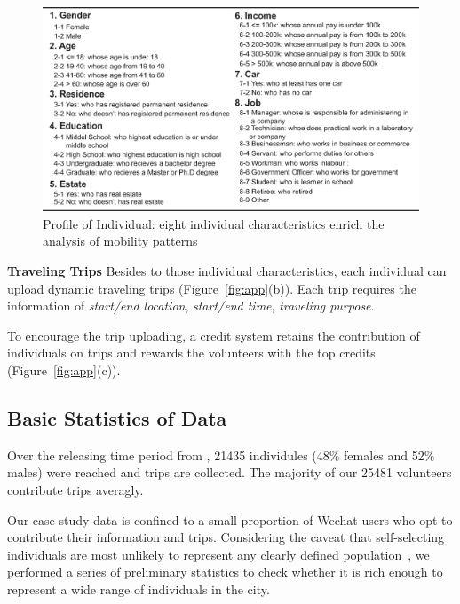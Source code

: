 \begin{figure}[htb!]
 \centering %
 \includegraphics[width=\columnwidth]{pictures/data_over}
 \caption{Profile of Individual: eight individual characteristics enrich the analysis of mobility patterns}
 \label{fig:data_over}
\end{figure}

\textbf{Traveling Trips} Besides to those individual characteristics, each individual can upload dynamic traveling trips (Figure~\ref{fig:app}(b)). Each trip requires the information of \textit{start/end location}, \textit{start/end time}, \textit{traveling purpose}. 

To encourage the trip uploading, a credit system retains the contribution of individuals on trips and rewards the volunteers with the top credits (Figure~\ref{fig:app}(c)). 


\subsection{Basic Statistics of Data}

Over the releasing time period from , 21435 individules (48\% females and 52\% males) were reached and  trips are collected. The majority of our 25481 volunteers contribute  trips averagly. 

Our case-study data is confined to a small proportion of Wechat users who opt to contribute their information and trips.
Considering the caveat that self-selecting individuals are most unlikely to represent any clearly defined population~\cite{Longley2015}, we performed a series of preliminary statistics to check whether it is rich enough to represent a wide range of individuals in the city. 


